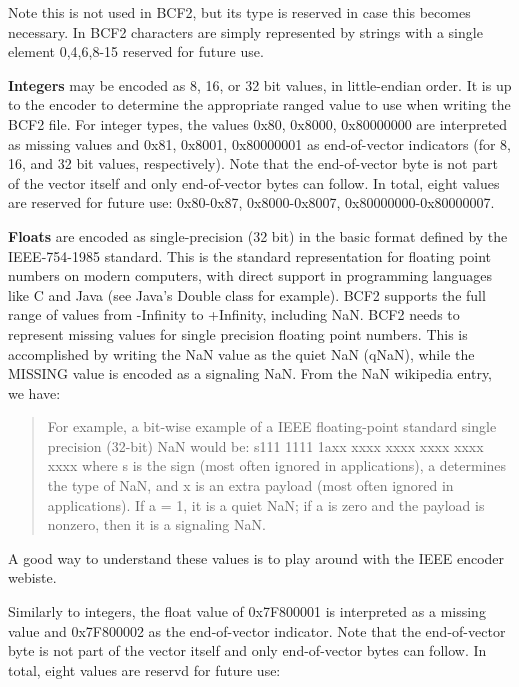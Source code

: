 \documentclass[8pt]{article}
\begin{document}
Note this is not used in BCF2, but its type is reserved in case this becomes necessary.  In BCF2 characters are simply represented by strings with a single element 0,4,6,8-15 reserved for future use.

\vspace{0.3cm}

\textbf{Integers} may be encoded as 8, 16, or 32 bit values, in little-endian
order.  It is up to the encoder to determine the appropriate ranged value to
use when writing the BCF2 file. 
For integer types, the values 0x80, 0x8000, 0x80000000 are interpreted as
missing values and 0x81, 0x8001, 0x80000001 as end-of-vector indicators
(for 8, 16, and 32 bit values, respectively). Note that the end-of-vector byte
is not part of the vector itself and only end-of-vector bytes can follow.
In total, eight values are reserved for future use: 0x80-0x87, 0x8000-0x8007, 0x80000000-0x80000007.


\vspace{0.3cm}
\textbf{Floats} are encoded as single-precision (32 bit) in the basic format
defined by the IEEE-754-1985 standard.  This is the standard representation for
floating point numbers on modern computers, with direct support in programming
languages like C and Java (see Java's Double class for example).  BCF2 supports
the full range of values from -Infinity to +Infinity, including NaN.  BCF2
needs to represent missing values for single precision floating point numbers.
This is accomplished by writing the NaN value as the quiet NaN (qNaN), while
the MISSING value is encoded as a signaling NaN.  From the NaN wikipedia entry,
we have:

\begin{quote}
For example, a bit-wise example of a IEEE floating-point standard single
precision (32-bit) NaN would be: s111 1111 1axx xxxx xxxx xxxx xxxx xxxx where
s is the sign (most often ignored in applications), a determines the type of
NaN, and x is an extra payload (most often ignored in applications).  If a = 1,
it is a quiet NaN; if a is zero and the payload is nonzero, then it is a
signaling NaN.
\end{quote}

\noindent A good way to understand these values is to play around with the IEEE encoder webiste.

\vspace{0.3cm}
\noindent Similarly to integers, the float value of 0x7F800001 is interpreted as a missing value
and 0x7F800002 as the end-of-vector indicator. Note that the end-of-vector byte
is not part of the vector itself and only end-of-vector bytes can follow. In total,
eight values are reservd for future use:
\end{document}
